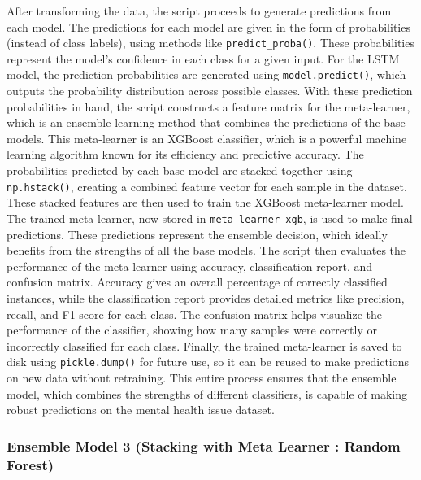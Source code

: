 \vspace{1em}

\noindent
After transforming the data, the script proceeds to generate predictions from each model. The predictions for each model are given in the form of probabilities (instead of class labels), using methods like \texttt{predict\_proba()}. These probabilities represent the model’s confidence in each class for a given input. For the LSTM model, the prediction probabilities are generated using \texttt{model.predict()}, which outputs the probability distribution across possible classes. With these prediction probabilities in hand, the script constructs a feature matrix for the meta-learner, which is an ensemble learning method that combines the predictions of the base models. This meta-learner is an XGBoost classifier, which is a powerful machine learning algorithm known for its efficiency and predictive accuracy. The probabilities predicted by each base model are stacked together using \texttt{np.hstack()}, creating a combined feature vector for each sample in the dataset. These stacked features are then used to train the XGBoost meta-learner model. The trained meta-learner, now stored in \texttt{meta\_learner\_xgb}, is used to make final predictions. These predictions represent the ensemble decision, which ideally benefits from the strengths of all the base models. The script then evaluates the performance of the meta-learner using accuracy, classification report, and confusion matrix. Accuracy gives an overall percentage of correctly classified instances, while the classification report provides detailed metrics like precision, recall, and F1-score for each class. The confusion matrix helps visualize the performance of the classifier, showing how many samples were correctly or incorrectly classified for each class. Finally, the trained meta-learner is saved to disk using \texttt{pickle.dump()} for future use, so it can be reused to make predictions on new data without retraining. This entire process ensures that the ensemble model, which combines the strengths of different classifiers, is capable of making robust predictions on the mental health issue dataset.

\pagebreak

\subsubsection{Ensemble Model 3 (Stacking with Meta Learner : Random Forest)}

